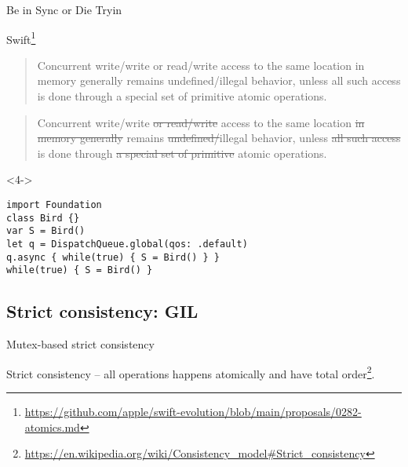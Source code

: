 \begin{frame}[fragile, t]{Be in Sync or Die Tryin}

Swift\footnote{\tiny\url{https://github.com/apple/swift-evolution/blob/main/proposals/0282-atomics.md}}

 {
\begin{quote}
Concurrent write/write or read/write access to the same location in memory generally remains undefined/illegal behavior, unless all such access is done through a special set of primitive atomic operations.
\end{quote}
}

 {
\begin{quote}
Concurrent write/write \sout{or read/write} access to the same location \sout{in memory generally} remains \sout{undefined/}illegal behavior, unless \sout{all such access} is done through \sout{a special set of primitive} atomic operations.
\end{quote} 
}


\begin{onlyenv}<4->
\begin{verbatim}
import Foundation
class Bird {}
var S = Bird()
let q = DispatchQueue.global(qos: .default)
q.async { while(true) { S = Bird() } }
while(true) { S = Bird() }
\end{verbatim}
\end{onlyenv}


\end{frame}

\subsection{Strict consistency: GIL}
\showTOCSub

\begin{frame}[fragile, t]{Mutex-based strict consistency}

Strict consistency -- all operations happens atomically and have total order\footnote{\tiny\url{https://en.wikipedia.org/wiki/Consistency_model#Strict_consistency}}.

\end{frame}


